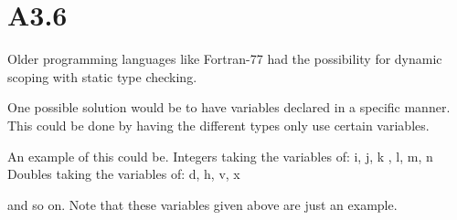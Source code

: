 \section{A3.6}
Older programming languages like Fortran-77 had the possibility for dynamic scoping
with static type checking.

One possible solution would be to have variables declared in a specific
manner. This could be done by having the different types only use certain
variables.

An example of this could be.
Integers taking the variables of: i, j, k , l, m, n
Doubles taking the variables of: d, h, v, x

and so on. Note that these variables given above are just an example.
